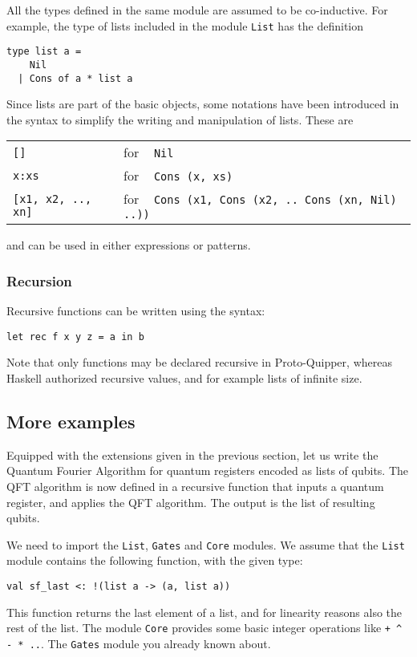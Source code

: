 All the types defined in the same module are assumed to be co-inductive. 
For example, the type of lists included in the module \verb#List# has the definition
\begin{verbatim}
type list a =
    Nil
  | Cons of a * list a
\end{verbatim}
Since lists are part of the basic objects, some notations have been introduced in the syntax to simplify the writing and manipulation
of lists. These are
	\begin{center}
	\begin{tabular}{ll}
		\verb#[]# & for ~ \verb#Nil# \\
		\verb#x:xs# & for ~ \verb#Cons (x, xs)# \\
		\verb#[x1, x2, .., xn]# & for ~ \verb#Cons (x1, Cons (x2, .. Cons (xn, Nil) ..))#
	\end{tabular}
	\end{center}
and can be used in either expressions or patterns.

\subsubsection{Recursion}

Recursive functions can be written using the syntax:
\begin{verbatim}
let rec f x y z = a in b
\end{verbatim}
Note that only functions may be declared recursive in Proto-Quipper, whereas Haskell authorized recursive values, and for example lists of infinite
size.

\subsection{More examples}

Equipped with the extensions given in the previous section, let us write the Quantum Fourier Algorithm for quantum registers encoded as lists
of qubits. The QFT algorithm is now defined in a recursive function that inputs a quantum register, and applies the QFT algorithm. The output
is the list of resulting qubits.

We need to import the \verb#List#, \verb#Gates# and \verb#Core# modules. We assume that the \verb#List# module contains the following function, 
with the given type:
\begin{verbatim}
val sf_last <: !(list a -> (a, list a))
\end{verbatim}
This function returns the last element of a list, and for linearity reasons also the rest of the list.
The module \verb#Core# provides some basic integer operations like \verb#+ ^ - * ..#. The \verb#Gates# module you already known about.

